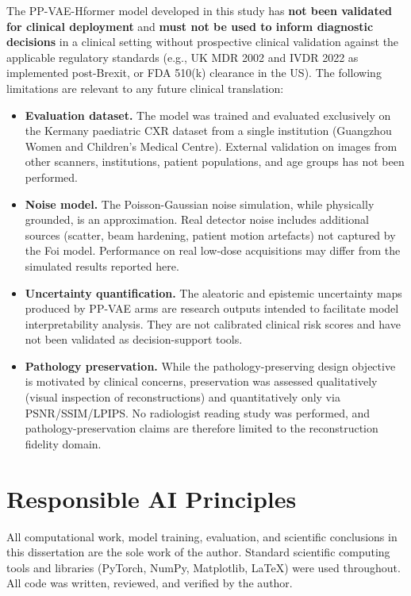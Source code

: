 \documentclass[12pt, a4paper, twoside, openright]{book}
\begin{document}
\begin{appendices}
The PP-VAE-Hformer model developed in this study has \textbf{not been validated for clinical deployment} and \textbf{must not be used to inform diagnostic decisions} in a clinical setting without prospective clinical validation against the applicable regulatory standards (e.g., UK MDR 2002 and IVDR 2022 as implemented post-Brexit, or FDA 510(k) clearance in the US). The following limitations are relevant to any future clinical translation:

\begin{itemize}
  \item \textbf{Evaluation dataset.} The model was trained and evaluated exclusively on the Kermany paediatric CXR dataset from a single institution (Guangzhou Women and Children's Medical Centre). External validation on images from other scanners, institutions, patient populations, and age groups has not been performed.
  \item \textbf{Noise model.} The Poisson-Gaussian noise simulation, while physically grounded, is an approximation. Real detector noise includes additional sources (scatter, beam hardening, patient motion artefacts) not captured by the Foi model. Performance on real low-dose acquisitions may differ from the simulated results reported here.
  \item \textbf{Uncertainty quantification.} The aleatoric and epistemic uncertainty maps produced by PP-VAE arms are research outputs intended to facilitate model interpretability analysis. They are not calibrated clinical risk scores and have not been validated as decision-support tools.
  \item \textbf{Pathology preservation.} While the pathology-preserving design objective is motivated by clinical concerns, preservation was assessed qualitatively (visual inspection of reconstructions) and quantitatively only via PSNR/SSIM/LPIPS. No radiologist reading study was performed, and pathology-preservation claims are therefore limited to the reconstruction fidelity domain.
\end{itemize}

\section{Responsible AI Principles}
\label{app:ethics:ai}

All computational work, model training, evaluation, and scientific conclusions in this dissertation are the sole work of the author. Standard scientific computing tools and libraries (PyTorch, NumPy, Matplotlib, \LaTeX) were used throughout. All code was written, reviewed, and verified by the author.


\end{appendices}
\end{document}
